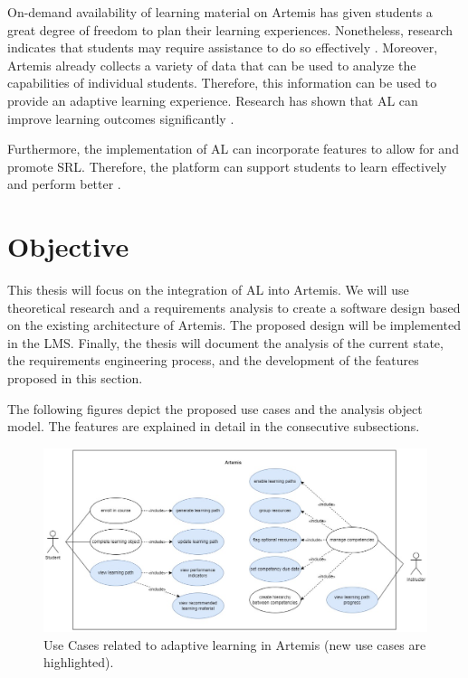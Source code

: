 \documentclass[a4paper,12pt,twoside]{article}
\begin{document}
On-demand availability of learning material on Artemis has given students a great degree of freedom to plan their learning experiences. Nonetheless, research
indicates that students may require assistance to do so effectively \cite{latham1991self}. Moreover, Artemis already collects a variety of data that can be used to analyze
the capabilities of individual students. Therefore, this information can be used to provide an adaptive learning experience. Research has shown that
\ac{AL} can improve learning outcomes significantly \cite{liu2017investigating}.

Furthermore, the implementation of \ac{AL} can incorporate features to allow for and promote \ac{SRL}. Therefore, the platform can support students to learn
effectively and perform better \cite{anthonysamy2020self}.


\section{Objective}

This thesis will focus on the integration of \ac{AL} into Artemis.
We will use theoretical research and a requirements analysis to create a software design based on the existing architecture of Artemis. The proposed
design will be implemented in the \ac{LMS}. Finally, the thesis will document the analysis of the current state, the requirements engineering process,
and the development of the features proposed in this section.

The following figures depict the proposed use cases and the analysis object model. The features are explained in detail in the consecutive subsections.

\begin{figure}[h!]
        \centering
        \includegraphics[width=\linewidth]{figures/UseCases(4).jpg}
        \caption{Use Cases related to adaptive learning in Artemis (new use cases are highlighted).}
        \label{fig:UseCases}
\end{figure}
\end{document}
